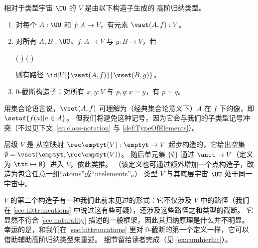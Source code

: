 \begin{defn}\label{defn:V}
  相对于类型宇宙 $\UU$ 的
  $V$ 是由以下构造子生成的
  高阶归纳类型。
  \begin{enumerate}
  \item 对每个 $A : \UU$ 和 $f : A \to V$，有元素 $\vset(A, f) : V$。
  \item 对所有 $A, B : \UU$、$f : A \to V$ 与 $g : B \to V$，若
    \begin{narrowmultline} \label{eq:V-path}
      \big(  \big) \land \narrowbreak
      \big(  \big)
    \end{narrowmultline}
    则有路径 $\id[V]{\vset(A,f)}{\vset(B,g)}$。
  \item 0-截断构造子：对所有 $x,y:V$ 与 $p,q:x=y$，有 $p=q$。
  \end{enumerate}
\end{defn}

用集合论语言说，$\vset(A,f)$ 可理解为（经典集合论意义下）$A$ 在 $f$ 下的像，即 $\setof{ f(a) | a \in A }$。
但我们将避免这种记号，因为它会与我们的子类型记号冲突（不过见下文~\eqref{eq:class-notation} 与 \cref{def:TypeOfElements}）。

层级 $V$ 是
从空映射 $\rec\emptyt(V) : \emptyt \to V$ 起步构造的，它给出空集 $\emptyset = \vset(\emptyt,\rec\emptyt(V))$。
随后单元集 $\{\emptyset\}$ 通过 $\unit \to V$（定义为 $\ttt \mapsto \emptyset$）进入 $V$，依此类推。
（该定义也可通过额外增加一个点构造子，改造为包含任意一组“atoms”或“urelements”。）
类型 $V$ 与其底层宇宙 $\UU$ 处于同一宇宙中。

$V$ 的第二个构造子有一种我们此前未见过的形式：它不仅涉及 $V$ 中的路径（我们在 \cref{sec:hittruncations} 中说过这有些可疑），还涉及这些路径之和类型的截断。
它显然不符合 \cref{sec:naturality} 描述的一般框架，因此其归纳原理是什么并不明显。
幸运的是，和我们在 \cref{sec:hittruncations} 里对 0-截断的第一个定义一样，它可以借助辅助高阶归纳类型来重述。
细节留给读者完成（见 \cref{ex:cumhierhit}）。


